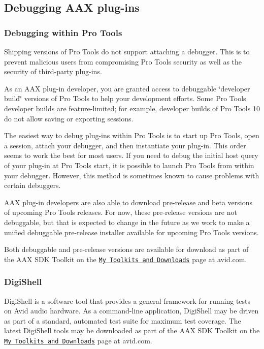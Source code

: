  \hypertarget{a00360_aax_pro_tools_guide_06_debugging_aax_plugins}{}\subsection{Debugging A\+A\+X plug-\/ins}\label{a00360_aax_pro_tools_guide_06_debugging_aax_plugins}
 \hypertarget{a00360_subsection__debugging_within_pro_tools}{}\subsubsection{Debugging within Pro Tools}\label{a00360_subsection__debugging_within_pro_tools}
 Shipping versions of Pro Tools do not support attaching a debugger. This is to prevent malicious users from compromising Pro Tools security as well as the security of third-\/party plug-\/ins.

As an A\+A\+X plug-\/in developer, you are granted access to debuggable \char`\"{}developer build\char`\"{} versions of Pro Tools to help your development efforts. Some Pro Tools developer builds are feature-\/limited; for example, developer builds of Pro Tools 10 do not allow saving or exporting sessions.

The easiest way to debug plug-\/ins within Pro Tools is to start up Pro Tools, open a session, attach your debugger, and then instantiate your plug-\/in. This order seems to work the best for most users. If you need to debug the initial host query of your plug-\/in at Pro Tools start, it is possible to launch Pro Tools from within your debugger. However, this method is sometimes known to cause problems with certain debuggers.

A\+A\+X plug-\/in developers are also able to download pre-\/release and beta versions of upcoming Pro Tools releases. For now, these pre-\/release versions are not debuggable, but that is expected to change in the future as we work to make a unified debuggable pre-\/release installer available for upcoming Pro Tools versions.

Both debuggable and pre-\/release versions are available for download as part of the A\+A\+X S\+D\+K Toolkit on the \href{https://my.avid.com/products/cppsdk}{\tt My Toolkits and Downloads} page at avid.\+com.

\hypertarget{a00360_subsection__digishell}{}\subsubsection{Digi\+Shell}\label{a00360_subsection__digishell}
 Digi\+Shell is a software tool that provides a general framework for running tests on Avid audio hardware. As a command-\/line application, Digi\+Shell may be driven as part of a standard, automated test suite for maximum test coverage. The latest Digi\+Shell tools may be downloaded as part of the A\+A\+X S\+D\+K Toolkit on the \href{https://my.avid.com/products/cppsdk}{\tt My Toolkits and Downloads} page at avid.\+com.

